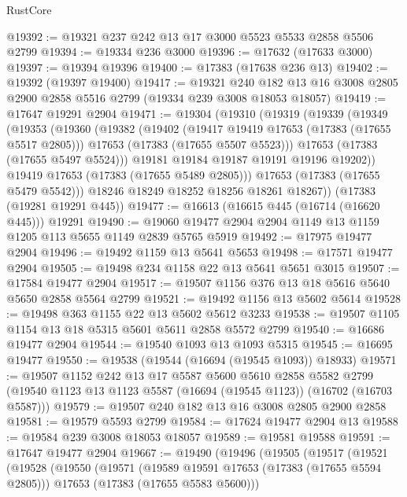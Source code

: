 \begin{lexlean}{RustCore}
\begin{coremodule}
@19392 := @19321 @237 @242 @13 @17 @3000 @5523 @5533 @2858 @5506 @2799
@19394 := @19334 @236 @3000
@19396 := @17632 (@17633 @3000)
@19397 := @19394 @19396
@19400 := @17383 (@17638 @236 @13)
@19402 := @19392 (@19397 @19400)
@19417 := @19321
    @240
    @182
    @13
    @16
    @3008
    @2805
    @2900
    @2858
    @5516
    @2799
    (@19334 @239 @3008 @18053 @18057)
@19419 := @17647 @19291 @2904
@19471 := @19304
    (@19310
      (@19319
        (@19339
          (@19349
            (@19353
              (@19360
                (@19382
                  (@19402
                    (@19417 @19419 @17653 (@17383 (@17655 @5517 @2805)))
                    @17653
                    (@17383 (@17655 @5507 @5523)))
                  @17653
                  (@17383 (@17655 @5497 @5524)))
                @19181
                @19184
                @19187
                @19191
                @19196
                @19202))
            @19419
            @17653
            (@17383 (@17655 @5489 @2805)))
          @17653
          (@17383 (@17655 @5479 @5542)))
        @18246
        @18249
        @18252
        @18256
        @18261
        @18267))
    (@17383 (@19281 @19291 @445))
@19477 := @16613 (@16615 @445 (@16714 (@16620 @445))) @19291
@19490 := @19060 @19477 @2904 @2904 @1149 @13 @1159 @1205 @113 @5655 @1149 @2839 @5765 @5919
@19492 := @17975 @19477 @2904
@19496 := @19492 @1159 @13 @5641 @5653
@19498 := @17571 @19477 @2904
@19505 := @19498 @234 @1158 @22 @13 @5641 @5651 @3015
@19507 := @17584 @19477 @2904
@19517 := @19507 @1156 @376 @13 @18 @5616 @5640 @5650 @2858 @5564 @2799
@19521 := @19492 @1156 @13 @5602 @5614
@19528 := @19498 @363 @1155 @22 @13 @5602 @5612 @3233
@19538 := @19507 @1105 @1154 @13 @18 @5315 @5601 @5611 @2858 @5572 @2799
@19540 := @16686 @19477 @2904
@19544 := @19540 @1093 @13 @1093 @5315
@19545 := @16695 @19477
@19550 := @19538 (@19544 (@16694 (@19545 @1093)) @18933)
@19571 := @19507
    @1152
    @242
    @13
    @17
    @5587
    @5600
    @5610
    @2858
    @5582
    @2799
    (@19540 @1123 @13 @1123 @5587 (@16694 (@19545 @1123)) (@16702 (@16703 @5587)))
@19579 := @19507 @240 @182 @13 @16 @3008 @2805 @2900 @2858
@19581 := @19579 @5593 @2799
@19584 := @17624 @19477 @2904 @13
@19588 := @19584 @239 @3008 @18053 @18057
@19589 := @19581 @19588
@19591 := @17647 @19477 @2904
@19667 := @19490
    (@19496
      (@19505
        (@19517
          (@19521
            (@19528
              (@19550
                (@19571
                  (@19589 @19591 @17653 (@17383 (@17655 @5594 @2805)))
                  @17653
                  (@17383 (@17655 @5583 @5600)))

\end{coremodule}
\end{lexlean}
